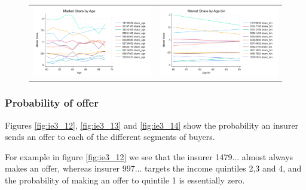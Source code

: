 \documentclass[12pt]{article}
\begin{document}
\begin{figure}[H] 
\caption{}
\label{fig:ie3_11}
\centering{}%
\begin{tabular}{cc}
\includegraphics[scale=0.24]{../figures/IE3_supply_age.png} &
\includegraphics[scale=0.24]{../figures/IE3_supply_agebin.png}
\end{tabular}
\end{figure}


\subsubsection{Probability of offer}
Figures \ref{fig:ie3_12}, \ref{fig:ie3_13} and \ref{fig:ie3_14} show the probability an insurer sends an offer to each of the different segments of buyers. 




For example in figure \ref{fig:ie3_12} we see that the insurer 1479... almost always makes an offer, whereas insurer 997... targets the income quintiles 2,3 and 4, and the probability of making an offer to quintile 1 is essentially zero. 
\end{document}
